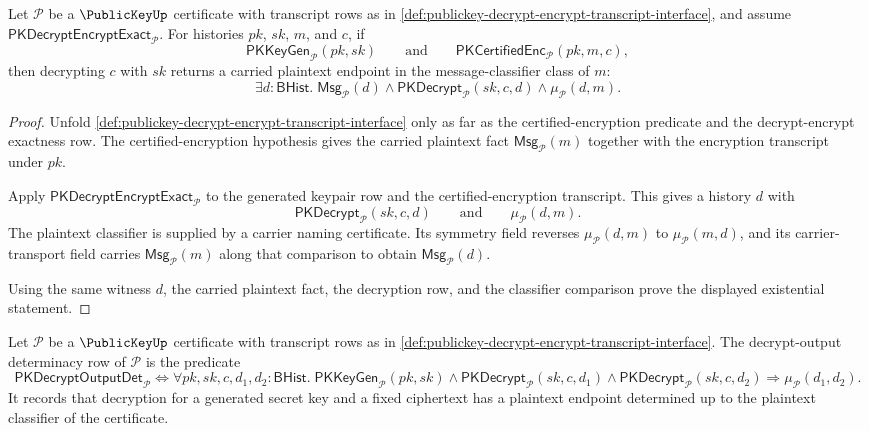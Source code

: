 \begin{theorem}
\label{thm:publickey-decrypt-encrypt-correctness}
Let $\mathcal P$ be a $\PublicKeyUp$ certificate with transcript rows as in \autoref{def:publickey-decrypt-encrypt-transcript-interface}, and assume $\mathsf{PKDecryptEncryptExact}_{\mathcal P}$. For histories $pk$, $sk$, $m$, and $c$, if
$$
\mathsf{PKKeyGen}_{\mathcal P}(pk,sk)
\qquad\text{and}\qquad
\mathsf{PKCertifiedEnc}_{\mathcal P}(pk,m,c),
$$
then decrypting $c$ with $sk$ returns a carried plaintext endpoint in the message-classifier class of $m$:
$$
\exists d:\mathsf{BHist}.\;
\mathsf{Msg}_{\mathcal P}(d)\land
\mathsf{PKDecrypt}_{\mathcal P}(sk,c,d)\land
\mu_{\mathcal P}(d,m).
$$
\end{theorem}
\begin{proof}
Unfold \autoref{def:publickey-decrypt-encrypt-transcript-interface} only as far as the certified-encryption predicate and the decrypt-encrypt exactness row. The certified-encryption hypothesis gives the carried plaintext fact $\mathsf{Msg}_{\mathcal P}(m)$ together with the encryption transcript under $pk$.

Apply $\mathsf{PKDecryptEncryptExact}_{\mathcal P}$ to the generated keypair row and the certified-encryption transcript. This gives a history $d$ with
$$
\mathsf{PKDecrypt}_{\mathcal P}(sk,c,d)
\qquad\text{and}\qquad
\mu_{\mathcal P}(d,m).
$$
The plaintext classifier is supplied by a carrier naming certificate. Its symmetry field reverses $\mu_{\mathcal P}(d,m)$ to $\mu_{\mathcal P}(m,d)$, and its carrier-transport field carries $\mathsf{Msg}_{\mathcal P}(m)$ along that comparison to obtain $\mathsf{Msg}_{\mathcal P}(d)$.

Using the same witness $d$, the carried plaintext fact, the decryption row, and the classifier comparison prove the displayed existential statement.
\end{proof}

\begin{definition}
\label{def:publickey-decrypt-output-determinacy-row}
Let $\mathcal P$ be a $\PublicKeyUp$ certificate with transcript rows as in \autoref{def:publickey-decrypt-encrypt-transcript-interface}. The decrypt-output determinacy row of $\mathcal P$ is the predicate
$$
\mathsf{PKDecryptOutputDet}_{\mathcal P}
\Longleftrightarrow
\forall pk,sk,c,d_1,d_2:\mathsf{BHist}.\;
\mathsf{PKKeyGen}_{\mathcal P}(pk,sk)\land
\mathsf{PKDecrypt}_{\mathcal P}(sk,c,d_1)\land
\mathsf{PKDecrypt}_{\mathcal P}(sk,c,d_2)
\Longrightarrow
\mu_{\mathcal P}(d_1,d_2).
$$
It records that decryption for a generated secret key and a fixed ciphertext has a plaintext endpoint determined up to the plaintext classifier of the certificate.
\end{definition}

